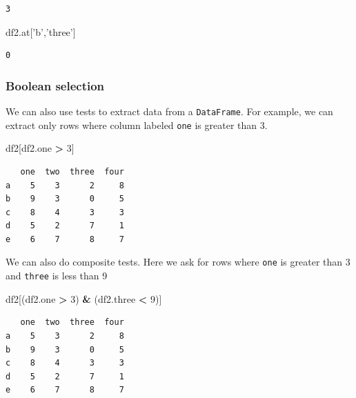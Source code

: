 \documentclass[
  letterpaper,
]{scrbook}
\newenvironment{Shaded}{\begin{snugshade}}{\end{snugshade}}
\newcommand{\DecValTok}[1]{\textcolor[rgb]{0.00,0.00,0.81}{#1}}
\newcommand{\NormalTok}[1]{#1}
\newcommand{\OperatorTok}[1]{\textcolor[rgb]{0.81,0.36,0.00}{\textbf{#1}}}
\newcommand{\StringTok}[1]{\textcolor[rgb]{0.31,0.60,0.02}{#1}}
\begin{document}
\begin{verbatim}
3
\end{verbatim}

\begin{Shaded}
\begin{Highlighting}[]
\NormalTok{df2.at[}\StringTok{'b'}\NormalTok{,}\StringTok{'three'}\NormalTok{]}
\end{Highlighting}
\end{Shaded}

\begin{verbatim}
0
\end{verbatim}

\hypertarget{boolean-selection}{%
\subsubsection{Boolean selection}\label{boolean-selection}}

We can also use tests to extract data from a \texttt{DataFrame}. For example, we can extract only rows where column labeled \texttt{one} is greater than 3.

\begin{Shaded}
\begin{Highlighting}[]
\NormalTok{df2[df2.one }\OperatorTok{>} \DecValTok{3}\NormalTok{]}
\end{Highlighting}
\end{Shaded}

\begin{verbatim}
   one  two  three  four
a    5    3      2     8
b    9    3      0     5
c    8    4      3     3
d    5    2      7     1
e    6    7      8     7
\end{verbatim}

We can also do composite tests. Here we ask for rows where \texttt{one} is greater than 3 and \texttt{three} is less than 9

\begin{Shaded}
\begin{Highlighting}[]
\NormalTok{df2[(df2.one }\OperatorTok{>} \DecValTok{3}\NormalTok{) }\OperatorTok{&}\NormalTok{ (df2.three }\OperatorTok{<} \DecValTok{9}\NormalTok{)]}
\end{Highlighting}
\end{Shaded}

\begin{verbatim}
   one  two  three  four
a    5    3      2     8
b    9    3      0     5
c    8    4      3     3
d    5    2      7     1
e    6    7      8     7
\end{verbatim}
\end{document}
